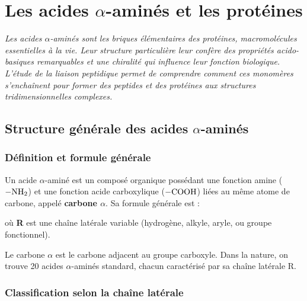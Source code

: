 \chapter{Les acides $\alpha$-aminés et les protéines}

\textit{Les acides $\alpha$-aminés sont les briques élémentaires des protéines, macromolécules essentielles à la vie. Leur structure particulière leur confère des propriétés acido-basiques remarquables et une chiralité qui influence leur fonction biologique. L'étude de la liaison peptidique permet de comprendre comment ces monomères s'enchaînent pour former des peptides et des protéines aux structures tridimensionnelles complexes.}

\section{Structure générale des acides $\alpha$-aminés}

\subsection{Définition et formule générale}

\begin{definition}
Un acide $\alpha$-aminé est un composé organique possédant une fonction amine ($\ce{-NH2}$) et une fonction acide carboxylique ($\ce{-COOH}$) liées au même atome de carbone, appelé \textbf{carbone $\alpha$}. Sa formule générale est :
\begin{center}
\end{center}
où \textbf{R} est une chaîne latérale variable (hydrogène, alkyle, aryle, ou groupe fonctionnel).
\end{definition}

\begin{remarque}
Le carbone $\alpha$ est le carbone adjacent au groupe carboxyle. Dans la nature, on trouve 20 acides $\alpha$-aminés standard, chacun caractérisé par sa chaîne latérale R.
\end{remarque}

\subsection{Classification selon la chaîne latérale}

